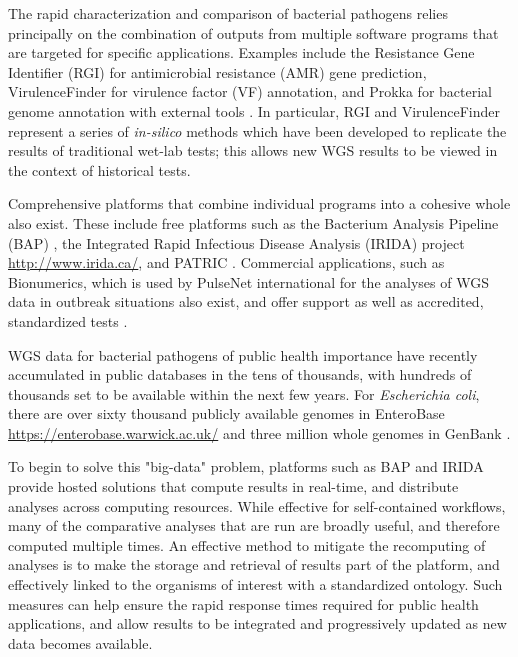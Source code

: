 \documentclass[a4,center,fleqn]{NAR}
\begin{document}
The rapid characterization and comparison of bacterial pathogens relies principally on the combination of outputs from multiple software programs that are targeted for specific applications. Examples include the Resistance Gene Identifier (RGI) \cite{mcarthur2013comprehensive} for antimicrobial resistance (AMR) gene prediction, VirulenceFinder \cite{kleinheinz2014applying} for virulence factor (VF) annotation, and Prokka for bacterial genome annotation with external tools \cite{doi:10.1093/bioinformatics/btu153}. In particular, RGI and VirulenceFinder represent a series of \textit{in-silico} methods which have been developed to replicate the results of traditional wet-lab tests; this allows new WGS results to be viewed in the context of historical tests.

Comprehensive platforms that combine individual programs into a cohesive whole also exist. These include free platforms such as the Bacterium Analysis Pipeline (BAP) \cite{thomsen2016bacterial}, the Integrated Rapid Infectious Disease Analysis (IRIDA) project \url{http://www.irida.ca/}, and PATRIC \cite{wattam2013patric}. Commercial applications, such as Bionumerics, which is used by PulseNet international for the analyses of WGS data in outbreak situations also exist, and offer support as well as accredited, standardized tests \cite{swaminathan2001pulsenet}.

WGS data for bacterial pathogens of public health importance have recently accumulated in public databases in the tens of thousands, with hundreds of thousands set to be available within the next few years. For \textit{Escherichia coli}, there are over sixty thousand publicly available genomes in EnteroBase \url{https://enterobase.warwick.ac.uk/} and three million whole genomes in GenBank \cite{doi:10.1093/nar/gks1195}.

To begin to solve this "big-data" problem, platforms such as BAP and IRIDA provide hosted solutions that compute results in real-time, and distribute analyses across computing resources. While effective for self-contained workflows, many of the comparative analyses that are run are broadly useful, and therefore computed multiple times. An effective method to mitigate the recomputing of analyses is to make the storage and retrieval of results part of the platform, and effectively linked to the organisms of interest with a standardized ontology. Such measures can help ensure the rapid response times required for public health applications, and allow results to be integrated and progressively updated as new data becomes available.
\end{document}

